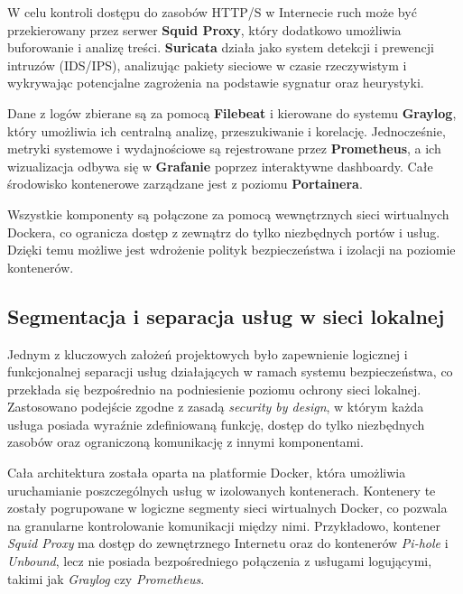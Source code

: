 \documentclass[
    left=2.5cm,         %
    right=2.5cm,        %
    top=2.5cm,          %
    bottom=3cm,         %
    bindingoffset=6mm,  %
    nohyphenation=true %
]{eiti/eiti-thesis} %
\begin{document}
W celu kontroli dostępu do zasobów HTTP/S w Internecie ruch może być przekierowany przez serwer \textbf{Squid Proxy}, który dodatkowo umożliwia buforowanie i analizę treści. \textbf{Suricata} działa jako system detekcji i prewencji intruzów (IDS/IPS), analizując pakiety sieciowe w czasie rzeczywistym i wykrywając potencjalne zagrożenia na podstawie sygnatur oraz heurystyki.

Dane z logów zbierane są za pomocą \textbf{Filebeat} i kierowane do systemu \textbf{Graylog}, który umożliwia ich centralną analizę, przeszukiwanie i korelację. Jednocześnie, metryki systemowe i wydajnościowe są rejestrowane przez \textbf{Prometheus}, a ich wizualizacja odbywa się w \textbf{Grafanie} poprzez interaktywne dashboardy. Całe środowisko kontenerowe zarządzane jest z poziomu \textbf{Portainera}.

Wszystkie komponenty są połączone za pomocą wewnętrznych sieci wirtualnych Dockera, co ogranicza dostęp z zewnątrz do tylko niezbędnych portów i usług. Dzięki temu możliwe jest wdrożenie polityk bezpieczeństwa i izolacji na poziomie kontenerów. 



\subsection{Segmentacja i separacja usług w sieci lokalnej}

Jednym z kluczowych założeń projektowych było zapewnienie logicznej i funkcjonalnej separacji usług działających w ramach systemu bezpieczeństwa, co przekłada się bezpośrednio na podniesienie poziomu ochrony sieci lokalnej. Zastosowano podejście zgodne z zasadą \textit{security by design}, w którym każda usługa posiada wyraźnie zdefiniowaną funkcję, dostęp do tylko niezbędnych zasobów oraz ograniczoną komunikację z innymi komponentami.

Cała architektura została oparta na platformie Docker, która umożliwia uruchamianie poszczególnych usług w izolowanych kontenerach. Kontenery te zostały pogrupowane w logiczne segmenty sieci wirtualnych Docker, co pozwala na granularne kontrolowanie komunikacji między nimi. Przykładowo, kontener \textit{Squid Proxy} ma dostęp do zewnętrznego Internetu oraz do kontenerów \textit{Pi-hole} i \textit{Unbound}, lecz nie posiada bezpośredniego połączenia z usługami logującymi, takimi jak \textit{Graylog} czy \textit{Prometheus}.
\end{document}
